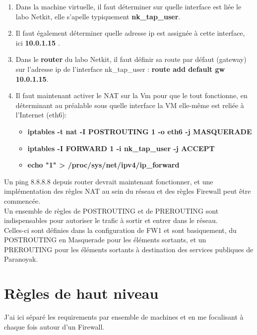 \documentclass[a4paper,10pt,final,fleqn]{article}
\begin{document}
	\begin{enumerate}
		\item Dans la machine virtuelle, il faut déterminer sur quelle interface est liée le labo Netkit, elle s'apelle typiquement \textbf{nk\_tap\_user}.\\
		\item Il faut également déterminer quelle adresse ip est assignée à cette interface, ici \textbf{10.0.1.15} . \\
		\item Dans le \textbf{router} du labo Netkit, il faut définir sa route par défaut (gateway) sur l'adresse ip de l'interface nk\_tap\_user : \textbf{route add default gw 10.0.1.15}.\\
		\item Il faut maintenant activer le NAT sur la Vm pour que le tout fonctionne, en déterminant au préalable sous quelle interface la VM elle-même est reliée à l'Internet (eth6): \\
		\begin{itemize}
			\item \textbf{iptables -t nat -I POSTROUTING 1 -o eth6 -j MASQUERADE}
			\item \textbf{iptables -I FORWARD 1 -i nk\_tap\_user -j ACCEPT}
			\item \textbf{echo "1" > /proc/sys/net/ipv4/ip\_forward}
		\end{itemize}
	\end{enumerate}

	Un ping 8.8.8.8 depuis router devrait maintenant fonctionner, et une implémentation des règles NAT au sein du réseau et des règles Firewall peut être commencée.\\

  Un ensemble de règles de POSTROUTING et de PREROUTING sont indispensables pour autoriser le trafic à sortir et entrer dans le réseau.\\
  Celles-ci sont définies dans la configuration de FW1 et sont basiquement, du POSTROUTING en Masquerade pour les éléments sortants, et un PREROUTING pour les éléments sortants à destination des services publiques de Paranoyak.\\
\section{Règles de haut niveau}

	J'ai ici séparé les requirements par ensemble de machines et en me focalisant à chaque fois autour d'un Firewall. \\
\end{document}
